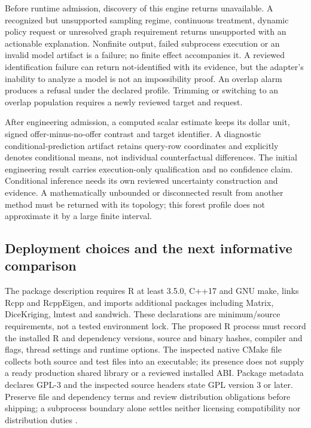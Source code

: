Before runtime admission, discovery of this engine returns unavailable.
A recognized but unsupported sampling regime, continuous treatment,
dynamic policy request or unresolved graph requirement returns
unsupported with an actionable explanation. Nonfinite output, failed
subprocess execution or an invalid model artifact is a failure; no
finite effect accompanies it. A reviewed identification failure can
return not-identified with its evidence, but the adapter's inability to
analyze a model is not an impossibility proof. An overlap alarm produces
a refusal under the declared profile. Trimming or switching to an
overlap population requires a newly reviewed target and request.

After engineering admission, a computed scalar estimate keeps its dollar
unit, signed offer-minus-no-offer contrast and target identifier. A
diagnostic conditional-prediction artifact retains query-row coordinates
and explicitly denotes conditional means, not individual counterfactual
differences. The initial engineering result carries execution-only
qualification and no confidence claim. Conditional inference needs its
own reviewed uncertainty construction and evidence. A mathematically
unbounded or disconnected result from another method must be returned
with its topology; this forest profile does not approximate it by a
large finite interval.

\subsection{Deployment choices and the next informative comparison}

The package description requires R at least 3.5.0, C++17 and GNU make,
links Rcpp and RcppEigen, and imports additional packages including
Matrix, DiceKriging, lmtest and sandwich. These declarations are
minimum/source requirements, not a tested environment lock. The proposed
R process must record the installed R and dependency versions, source
and binary hashes, compiler and flags, thread settings and runtime
options. The inspected native CMake file collects both source and test
files into an executable; its presence does not supply a ready
production shared library or a reviewed installed ABI. Package metadata
declares GPL-3 and the inspected source headers state GPL version 3 or
later. Preserve file and dependency terms and review distribution
obligations before shipping; a subprocess boundary alone settles neither
licensing compatibility nor distribution duties
\cite{exec13_grf_runtime}.

